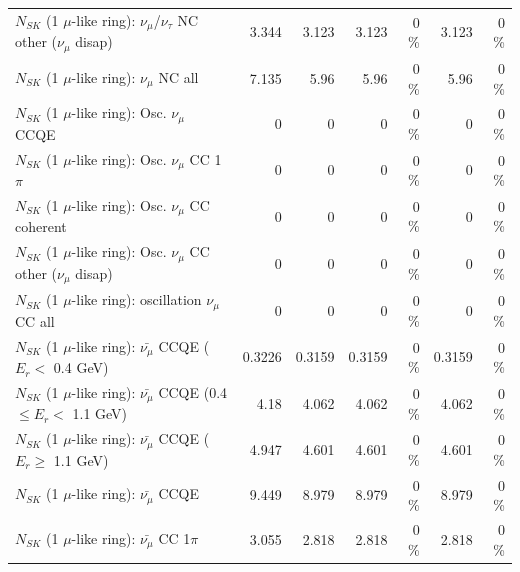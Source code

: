 \begin{table}
\begin{tabular}{| l | r | r | r  r | r  r |}
   $N_{SK}$ (1 $\mu$-like ring): $\nu_\mu$/$\nu_\tau$ NC other ($\nu_\mu$ disap) &           3.344 &           3.123 &           3.123 &        0 \%  &           3.123 &        0 \%  \\ 
                                $N_{SK}$ (1 $\mu$-like ring): $\nu_{\mu}$ NC all &           7.135 &            5.96 &            5.96 &        0 \%  &            5.96 &        0 \%  \\ 
\hline
\hline
                               $N_{SK}$ (1 $\mu$-like ring): Osc. $\nu_\mu$ CCQE &               0 &               0 &               0 &        0 \%  &               0 &        0 \%  \\ 
                          $N_{SK}$ (1 $\mu$-like ring): Osc. $\nu_\mu$ CC 1$\pi$ &               0 &               0 &               0 &        0 \%  &               0 &        0 \%  \\ 
                        $N_{SK}$ (1 $\mu$-like ring): Osc. $\nu_\mu$ CC coherent &               0 &               0 &               0 &        0 \%  &               0 &        0 \%  \\ 
         $N_{SK}$ (1 $\mu$-like ring): Osc. $\nu_\mu$ CC other ($\nu_\mu$ disap) &               0 &               0 &               0 &        0 \%  &               0 &        0 \%  \\ 
                      $N_{SK}$ (1 $\mu$-like ring): oscillation $\nu_\mu$ CC all &               0 &               0 &               0 &        0 \%  &               0 &        0 \%  \\ 
\hline
\hline
          $N_{SK}$ (1 $\mu$-like ring): $\bar{\nu_\mu}$ CCQE ($E_{r} <$ 0.4 GeV) &          0.3226 &          0.3159 &          0.3159 &        0 \%  &          0.3159 &        0 \%  \\ 
 $N_{SK}$ (1 $\mu$-like ring): $\bar{\nu_\mu}$ CCQE (0.4 $\leq E_{r} <$ 1.1 GeV) &            4.18 &           4.062 &           4.062 &        0 \%  &           4.062 &        0 \%  \\ 
       $N_{SK}$ (1 $\mu$-like ring): $\bar{\nu_\mu}$ CCQE ($E_{r} \geq$ 1.1 GeV) &           4.947 &           4.601 &           4.601 &        0 \%  &           4.601 &        0 \%  \\ 
\hline
                              $N_{SK}$ (1 $\mu$-like ring): $\bar{\nu_\mu}$ CCQE &           9.449 &           8.979 &           8.979 &        0 \%  &           8.979 &        0 \%  \\ 
                         $N_{SK}$ (1 $\mu$-like ring): $\bar{\nu_\mu}$ CC 1$\pi$ &           3.055 &           2.818 &           2.818 &        0 \%  &           2.818 &        0 \%  \\ 

\end{tabular}
\end{table}
